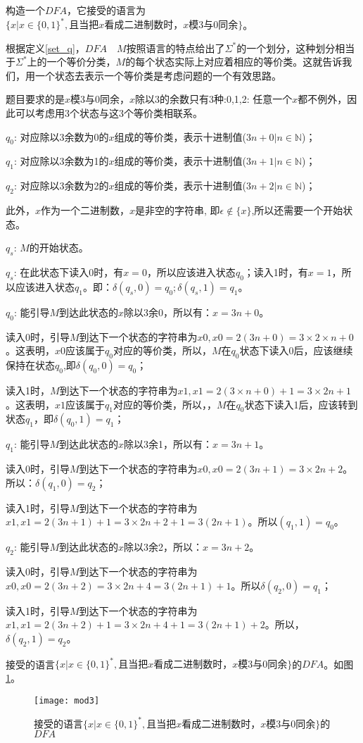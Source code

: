 \begin{example}
	构造一个$DFA$，它接受的语言为$\{x|x\in \{0,1\}^{\ast}, \text{且当把$x$看成二进制数时，$x$模3与0同余}\}$。 
	
	根据定义\ref{set_q}，$DFA\quad M$按照语言的特点给出了$\Sigma^\ast$的一个划分，这种划分相当于$\Sigma^\ast$上的一个等价分类，$M$的每个状态实际上对应着相应的等价类。这就告诉我们，用一个状态去表示一个等价类是考虑问题的一个有效思路。
	
	题目要求的是$x$模3与0同余，$x$除以3的余数只有3种:0,1,2: 任意一个$x$都不例外，因此可以考虑用3个状态与这3个等价类相联系。
	
	$q_0$: 对应除以3余数为0的$x$组成的等价类，表示十进制值($3n+0|n\in\mathbb{N}$)；
	
	$q_1$: 对应除以3余数为1的$x$组成的等价类，表示十进制值($3n+1|n\in\mathbb{N}$)；
	
	$q_2$: 对应除以3余数为2的$x$组成的等价类，表示十进制值($3n+2|n\in\mathbb{N}$)；
	
	此外，$x$作为一个二进制数，$x$是非空的字符串, 即$\epsilon\notin \{x\}$,所以还需要一个开始状态。
	
	$q_s$: $M$的开始状态。
	
	$q_s$: 在此状态下读入0时，有$x=0$，所以应该进入状态$q_0$；读入1时，有$x=1$，所以应该进入状态$q_1$。即：$\delta(q_s,0)= q_0; δ(q_s,1)= q_1$。
	
	$q_0$: 能引导$M$到达此状态的$x$除以3余0，所以有：$x=3n+0$。
	
	读入0时，引导$M$到达下一个状态的字符串为$x0,x0=2(3n+0)=3\times 2\times n+0$。这表明，$x0$应该属于$q_0$对应的等价类，所以，$M$在$q_0$状态下读入0后，应该继续保持在状态$q_0$,即$\delta(q_0,0)= q_0$；
	
	读入1时，$M$到达下一个状态的字符串为$x1,x1=2(3\times n+0)+1=3\times 2n+1$。这表明，$x1$应该属于$q_1$对应的等价类，所以，，$M$在$q_0$状态下读入1后，应该转到状态$q_1$，即$\delta(q_0,1)= q_1$；
	
	$q_1$: 能引导$M$到达此状态的$x$除以3余1，所以有：$x=3n+1$。
	
	读入0时，引导$M$到达下一个状态的字符串为$x0,x0=2(3n+1)=3\times 2n+2$。所以：$\delta(q_1,0)= q_2$；
	
	读入1时，引导$M$到达下一个状态的字符串为$x1,x1=2(3n+1)+1=3\times 2n+2+1=3(2n+1)$。所以$(q_1,1)= q_0$。 
	
	$q_2$: 能引导$M$到达此状态的$x$除以3余2，所以：$x=3n+2$。
	
	读入0时，引导$M$到达下一个状态的字符串为$x0,x0=2(3n+2)=3\times 2n+4=3(2n+1)+1$。所以$\delta(q_2,0)= q_1$；
	
	读入1时，引导$M$到达下一个状态的字符串为$x1,x1=2(3n+2)+1=3\times 2n+4+1=3(2n+1)+2$。所以，$\delta(q_2,1)= q_2$。
	
	接受的语言$\{x|x\in \{0,1\}^{\ast}, \text{且当把$x$看成二进制数时，$x$模3与0同余}\}$的$DFA$。如图\ref{fig:mod3}。 
	
	\begin{figure}[htbp]
		\texttt{[image: mod3]}
		\caption{接受的语言$\{x|x\in \{0,1\}^{\ast}, \text{且当把$x$看成二进制数时，$x$模3与0同余}\}$的$DFA$}
		\label{fig:mod3}       %
	\end{figure}
\end{example}

